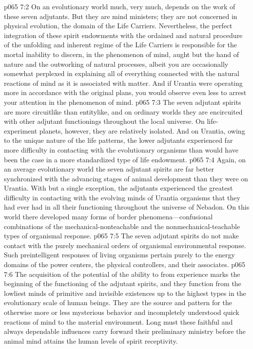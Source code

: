\vs p065 7:2 On an evolutionary world much, very much, depends on the work of these seven adjutants. But they are mind ministers; they are not concerned in physical evolution, the domain of the Life Carriers. Nevertheless, the perfect integration of these spirit endowments with the ordained and natural procedure of the unfolding and inherent regime of the Life Carriers is responsible for the mortal inability to discern, in the phenomenon of mind, aught but the hand of nature and the outworking of natural processes, albeit you are occasionally somewhat perplexed in explaining all of everything connected with the natural reactions of mind as it is associated with matter. And if Urantia were operating more in accordance with the original plans, you would observe even less to arrest your attention in the phenomenon of mind.
\vs p065 7:3 The seven adjutant spirits are more circuitlike than entitylike, and on ordinary worlds they are encircuited with other adjutant functionings throughout the local universe. On life\hyp{}experiment planets, however, they are relatively isolated. And on Urantia, owing to the unique nature of the life patterns, the lower adjutants experienced far more difficulty in contacting with the evolutionary organisms than would have been the case in a more standardized type of life endowment.\plusone
\vs p065 7:4 Again, on an average evolutionary world the seven adjutant spirits are far better synchronized with the advancing stages of animal development than they were on Urantia. With but a single exception, the adjutants experienced the greatest difficulty in contacting with the evolving minds of Urantia organisms that they had ever had in all their functioning throughout the universe of Nebadon. On this world there developed many forms of border phenomena---confusional combinations of the mechanical\hyp{}nonteachable and the nonmechanical\hyp{}teachable types of organismal response.
\vs p065 7:5 The seven adjutant spirits do not make contact with the purely mechanical orders of organismal environmental response. Such preintelligent responses of living organisms pertain purely to the energy domains of the power centers, the physical controllers, and their associates.
\vs p065 7:6 The acquisition of the potential of the ability to  from experience marks the beginning of the functioning of the adjutant spirits, and they function from the lowliest minds of primitive and invisible existences up to the highest types in the evolutionary scale of human beings. They are the source and pattern for the otherwise more or less mysterious behavior and incompletely understood quick reactions of mind to the material environment. Long must these faithful and always dependable influences carry forward their preliminary ministry before the animal mind attains the human levels of spirit receptivity.
